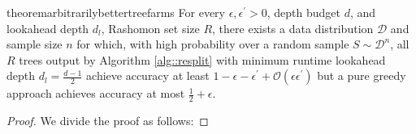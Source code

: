 \begin{restatable}{theorem}{arbitrarilybettertreefarms}
    \label{thm::arbitrarily_better_treefarms}
    For every $\epsilon, \epsilon^\prime > 0$, depth budget $d$, and lookahead depth $d_l$, Rashomon set size $R$, there exists a data distribution $\mathcal{D}$ and sample size $n$ for which, with high probability over a random sample $S \sim \mathcal{D}^n$, all $R$ trees output by Algorithm \ref{alg::resplit} with minimum runtime lookahead depth $d_l = \frac{d-1}{2}$ achieve accuracy at least $1-\epsilon - \epsilon^\prime + \mathcal{O}(\epsilon\epsilon^\prime)$ but a pure greedy approach achieves accuracy at most $\frac{1}{2} + \epsilon$.
\end{restatable}
\begin{proof}
We divide the proof as follows:

\end{proof}

